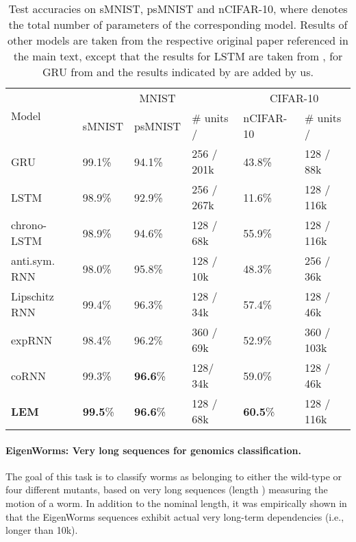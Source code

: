 \documentclass{article} \usepackage{iclr2022_conference,times}
\begin{document}
\begin{table}[ht!]
\caption{Test accuracies on sMNIST, psMNIST and nCIFAR-10, where  denotes the total number of parameters of the corresponding model. Results of other models are taken from the respective original paper referenced in the main text, except that the results for LSTM are taken from \citet{scornn}, for GRU from \citet{GRU_results} and the results indicated by  are added by us.}
\label{tab:image}
\centering
\begin{tabular}{llllll}
\toprule
\cmidrule(r){1-6}
\multirow{2}{*}{Model} &  \multicolumn{3}{c}{MNIST} & \multicolumn{2}{c}{CIFAR-10} \\
\cmidrule(r){2-4}\cmidrule(r){5-6}  
& sMNIST & psMNIST &\# units /  & nCIFAR-10 & \# units /  \\
\midrule
GRU & 99.1\% & 94.1\% & 256 / 201k & 43.8\%& 128 / 88k\\
LSTM & 98.9\% & 92.9\% & 256 / 267k & 11.6\% & 128 / 116k \\
chrono-LSTM & 98.9\% & 94.6\% & 128 / 68k & 55.9\% & 128 / 116k \\
anti.sym. RNN &  98.0\% & 95.8\% & 128 / 10k & 48.3\% & 256 / 36k\\
Lipschitz RNN & 99.4\% & 96.3\% & 128 / 34k & 57.4\% & 128 / 46k \\
expRNN &  98.4\% &  96.2\%& 360 / 69k & 52.9\%& 360 / 103k \\
coRNN & 99.3\% & \textbf{96.6}\% & 128/ 34k & 59.0\% & 128 / 46k\\
\textbf{LEM} & \textbf{99.5}\% & \textbf{96.6}\% & 128 / 68k & \textbf{60.5}\% & 128 / 116k\\
    \bottomrule
  \end{tabular}
\end{table}
\paragraph{EigenWorms: Very long sequences for genomics classification.}
The goal of this task \citep{eigenworms} is to classify worms as belonging to either the wild-type or four different mutants, based on  very long sequences (length ) measuring the motion of a worm. In addition to the nominal length, it was empirically shown in \citet{unicornn} that the EigenWorms sequences exhibit actual very long-term dependencies (i.e., longer than 10k). 
\end{document}
